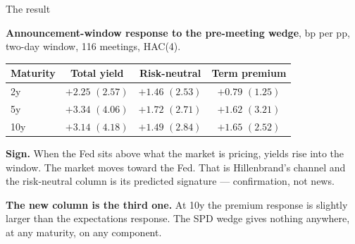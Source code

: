 \documentclass[aspectratio=169, 11pt]{beamer}
\begin{document}
\begin{frame}{The result}

\textbf{Announcement-window response to the pre-meeting wedge}, bp per pp,
two-day window, 116 meetings, HAC(4).

\vspace{0.5em}

\begin{center}
\small
\begin{tabular}{lccc}
\toprule
Maturity & Total yield & Risk-neutral & Term premium \\
\midrule
2y  & $+2.25$ \; $(2.57)$ & $+1.46$ \; $(2.53)$ & $+0.79$ \; $(1.25)$ \\
5y  & $+3.34$ \; $(4.06)$ & $+1.72$ \; $(2.71)$ & $\mathbf{+1.62}$ \; $(3.21)$ \\
10y & $+3.14$ \; $(4.18)$ & $+1.49$ \; $(2.84)$ & $\mathbf{+1.65}$ \; $(2.52)$ \\
\bottomrule
\end{tabular}
\end{center}

\vspace{0.8em}

\textbf{Sign.} When the Fed sits above what the market is pricing, yields
rise into the window. The market moves toward the Fed. That is
Hillenbrand's channel and the risk-neutral column is its predicted signature
--- confirmation, not news.

\vspace{0.6em}

\textbf{The new column is the third one.} At 10y the premium response is
slightly larger than the expectations response. The SPD wedge gives nothing
anywhere, at any maturity, on any component.

\end{frame}
\end{document}
